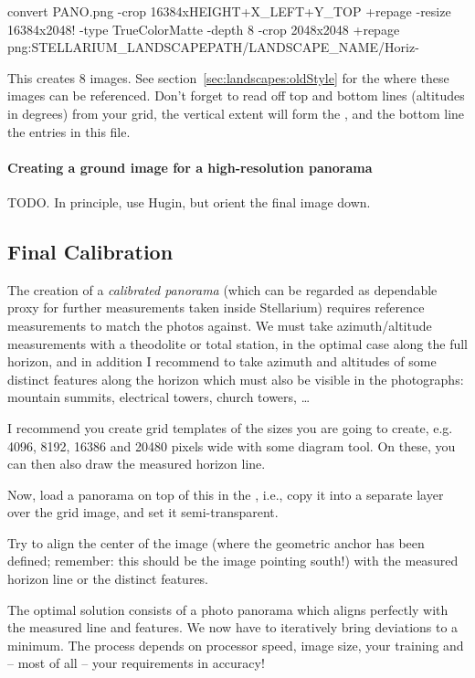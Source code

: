 \begin{commands}
 convert PANO.png  -crop 16384xHEIGHT+X_LEFT+Y_TOP +repage  
      -resize 16384x2048! 
      -type TrueColorMatte -depth 8 
      -crop 2048x2048 +repage 
       png:STELLARIUM_LANDSCAPEPATH/LANDSCAPE_NAME/Horiz-%
\end{commands}
%
This creates 8 images. See section~\ref{sec:landscapes:oldStyle} for
the  where these images can be referenced. Don't
forget to read off top and bottom lines (altitudes in degrees) from
your grid, the vertical extent will form the , and
the bottom line the  entries in this file.

\paragraph{Creating a ground image for a high-resolution panorama}
TODO. In principle, use Hugin, but orient the final image down.

\subsection{Final Calibration}
\label{sec:landscapes:FinalCalibration}

The creation of a \emph{calibrated panorama} (which can be regarded as
dependable proxy for further measurements taken inside Stellarium)
requires reference measurements to match the photos against. We must
take azimuth/altitude measurements with a theodolite or total station,
in the optimal case along the full horizon, and in addition I
recommend to take azimuth and altitudes of some distinct features along
the horizon which must also be visible in the photographs: mountain
summits, electrical towers, church towers, \ldots

I recommend you create grid templates of the sizes you are going to
create, e.g. 4096, 8192, 16386 and 20480 pixels wide with some diagram
tool. On these, you can then also draw the measured horizon line.

Now, load a panorama on top of this in the , i.e., copy it
into a separate layer over the grid image, and set it
semi-transparent.

Try to align the center of the image (where the
geometric anchor has been defined; remember: this should be the 
image pointing south!) with the measured horizon line or the distinct features.

The optimal solution consists of a photo panorama which aligns
perfectly with the measured line and features. We now have to
iteratively bring deviations to a minimum. The process depends on
processor speed, image size, your training  and -- most
of all -- your requirements in accuracy!


